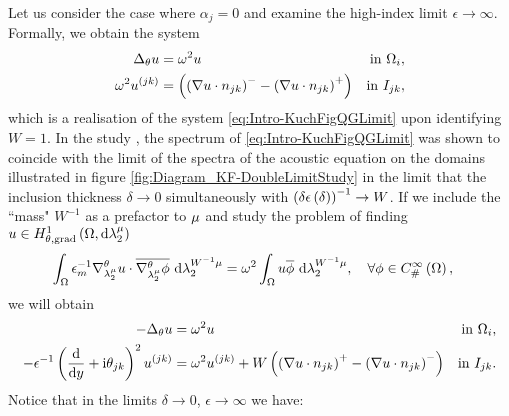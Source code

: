 Let us consider the case where $\alpha_j=0$ and examine the high-index limit $\epsilon\rightarrow\infty$.
Formally, we obtain the system
\begin{subequations}
	\begin{align*}
		\Delta_\theta u 
		&= \omega^2 u 
		&\text{in } \Omega_i, \\
		\omega^2 u^{(jk)}
		&= \left( \left( \nabla u\cdot n_{jk} \right)^- - \left( \nabla u\cdot n_{jk} \right)^+ \right)
		&\text{in } I_{jk},
	\end{align*}
\end{subequations}
which is a realisation of the system \eqref{eq:Intro-KuchFigQGLimit} upon identifying $W=1$.
In the study \cite{figotin1998spectral}, the spectrum of \eqref{eq:Intro-KuchFigQGLimit} was shown to coincide with the limit of the spectra of the acoustic equation on the domains illustrated in figure  \ref{fig:Diagram_KF-DoubleLimitStudy} in the limit that the inclusion thickness $\delta\rightarrow0$ simultaneously with $\left( \delta\epsilon\left( \delta \right) \right)^{-1}\rightarrow W$.
If we include the ``mass" $W^{-1}$ as a prefactor to $\mu$ and study the problem of finding $u\in H^1_{\theta, \mathrm{grad}}\left( \Omega, \mathrm{d}\lambda_2^{\mu} \right)$
\begin{align*}
	\int_{\Omega} \epsilon_m^{-1}\nabla^{\theta}_{\lambda_2^{\mu}}u\cdot\overline{\nabla^{\theta}_{\lambda_2^{\mu}}\phi}  \ \mathrm{d}\lambda_2^{W^{-1}\mu}
	&= \omega^2 \int_{\Omega} u\overline{\phi}  \ \mathrm{d}\lambda_2^{W^{-1}\mu}, \quad\forall\phi\in C^{\infty}_{\#}\left( \Omega \right),
\end{align*}
we will obtain
\begin{subequations}
	\begin{align*}
		-\Delta_\theta u 
		&= \omega^2 u 
		&\text{in } \Omega_i, \\
		- \epsilon^{-1}\left( \dfrac{\mathrm{d}}{\mathrm{d}y} + \mathrm{i}\theta_{jk} \right)^2u^{(jk)}  
		&= \omega^2 u^{(jk)} + W\left( \left( \nabla u\cdot n_{jk} \right)^+ - \left( \nabla u\cdot n_{jk} \right)^- \right)
		&\text{in } I_{jk}.
	\end{align*}
\end{subequations}
Notice that in the limits $\delta\rightarrow0$, $\epsilon\rightarrow\infty$ we have:
